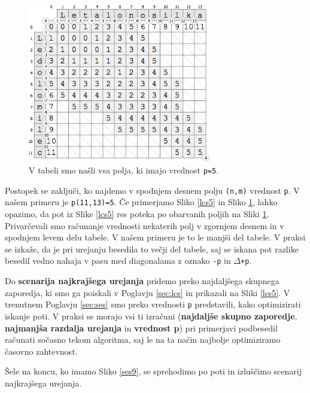 \documentclass[a4paper, 12pt, twoside]{book}
\begin{document}
\begin{figure}[placement h]
\begin{center}
\includegraphics[width=8cm]{ses8.png}
\end{center}
\caption{V tabeli smo našli vsa polja, ki imajo vrednost {\tt p=5}.}
\label{ses8}
\end{figure}

Postopek se zaključi, ko najdemo v spodnjem desnem polju {\tt (n,m)} vrednost {\tt p}. V našem primeru je {\tt p(11,13)=5}. Če primerjamo Sliko \ref{lcs5} in Sliko \ref{ses8}, lahko opazimo, da pot iz Slike \ref{lcs5} res poteka po obarvanih poljih na Sliki \ref{ses8}. Privarčevali smo računanje vrednosti nekaterih polj v zgornjem desnem in v spodnjem levem delu tabele. V našem primeru je to le manjši del tabele. V praksi se izkaže, da je pri urejanju besedila to večji del tabele, saj se iskana pot razlike besedil vedno nahaja v pasu med diagonalama z oznako {\tt -p} in {\tt $\Delta$+p}.

Do \textbf{scenarija najkrajšega urejanja} pridemo preko najdaljšega skupnega zaporedja, ki smo ga poiskali v Poglavju \ref{sec:lcs} in prikazali na Sliki \ref{lcs5}. V trenutnem Poglavju \ref{sec:ses} smo preko vrednosti {\tt p} predstavili, kako optimizirati iskanje poti. V praksi se morajo vsi ti izračuni (\textbf{najdaljše skupno zaporedje}, \textbf{najmanjša razdalja urejanja} in \textbf{vrednost p}) pri primerjavi podbesedil računati sočasno tekom algoritma, saj le na ta način najbolje optimiziramo časovno zahtevnost.

\pagebreak

Šele na koncu, ko imamo Sliko \ref{ses9}, se sprehodimo po poti in izluščimo scenarij najkrajšega urejanja.
\end{document}
